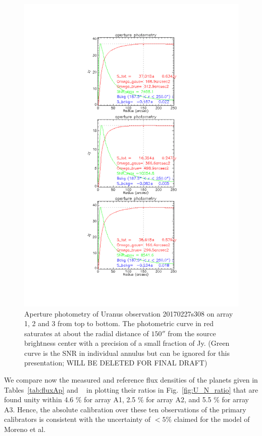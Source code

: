 \begin{figure}
\begin{center}
  \includegraphics[clip, angle=0, scale=0.4]{Figures/Uranus_s308.pdf}
  \caption{Aperture photometry of Uranus observation 20170227s308  on array 1, 2 and 3 from top to bottom.
    The photometric curve in red saturates at about the radial distance of $150''$ from the
    source brightness center with a precision of a small fraction of Jy. (Green curve is the SNR in individual annulus but can be ignored for this
  presentation; WILL BE DELETED FOR FINAL DRAFT)}
\label{fig:PhAp}
\end{center}
\end{figure}

We compare now the measured and reference flux densities of the planets given in Tables~\ref{tab:fluxAp} and ~\label{tab:FluxPred}
in plotting their  ratios in Fig.~\ref{fig:U_N_ratio} that are found  unity within 4.6 \% for array A1,  2.5 \% for array A2, and
5.5 \% for array A3. Hence,
the absolute calibration over these ten observations of the primary calibrators is consistent with the uncertainty of $< 5\%$
claimed for the model of Moreno et al.




